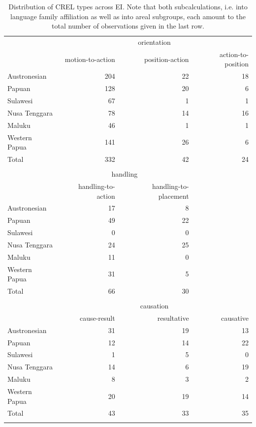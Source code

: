 \begin{table}
\begin{tabular}{lrrr}
  \lsptoprule
&\multicolumn{3}{c}{orientation}\\
 & {motion-to-action} & {position-action} & {action-to-position}\\  
  \midrule
  Austronesian & 204 & 22 & 18\tabularnewline
  Papuan & 128 & 20 &  6\tabularnewline
   \midrule
  Sulawesi & 67 & 1 & 1\tabularnewline
  Nusa Tenggara & 78 & 14 & 16\tabularnewline
  Maluku & 46 & 1 & 1\tabularnewline 
  Western Papua & 141 & 26 & 6 \tabularnewline 
\midrule
Total & 332 & 42 & 24\tabularnewline
\midrule
\\
  \midrule
& \multicolumn{2}{c}{handling} &\\
& {handling-to-action} & {handling-to-placement}\\ 
  \midrule
  Austronesian & 17 & 8 \tabularnewline
  Papuan &  49 & 22 \tabularnewline
   \midrule
  Sulawesi & 0 & 0 \tabularnewline
  Nusa Tenggara & 24 & 25 \tabularnewline
  Maluku & 11 & 0 \tabularnewline 
  Western Papua & 31 & 5  \tabularnewline 
\midrule
Total  & 66 & 30 \tabularnewline
\midrule
\\
  \midrule
&  \multicolumn{3}{c}{causation} \\
 & {cause-result} & {resultative} & {causative} \\  
  \midrule
  Austronesian & 31 & 19 & 13 \tabularnewline
  Papuan & 12 & 14 & 22 \tabularnewline
   \midrule
  Sulawesi & 1 & 5 & 0 \tabularnewline
  Nusa Tenggara & 14 & 6 & 19 \tabularnewline
  Maluku & 8 & 3 & 2 \tabularnewline 
  Western Papua & 20 & 19 & 14 \tabularnewline 
\midrule
Total & 43 & 33 & 35 \tabularnewline
\lspbottomrule
\end{tabular}
\caption[Distribution of SREL types across EI]{Distribution of CREL types across EI. Note that both subcalculations, i.e. into language family affiliation as well as into areal subgroups, each amount to the total number of observations given in the last row.}
\label{table:SREL_overview}
\end{table}

